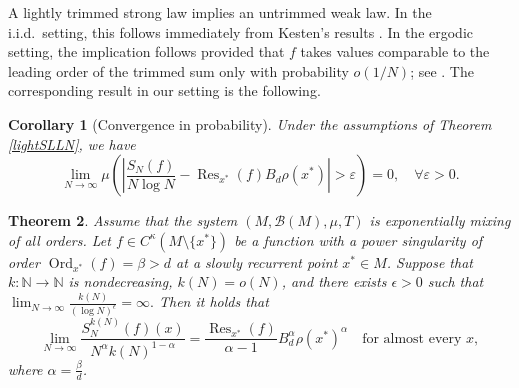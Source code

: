 \documentclass[11pt,twoside,a4paper,reqno]{amsart}
\newtheorem{theorem}{Theorem}
\newtheorem{corollary}[theorem]{Corollary}
\begin{document}
A lightly trimmed strong law implies an untrimmed weak law. In the i.i.d.\ setting, this follows immediately from Kesten's results \cite{kestenweak}. In the ergodic setting, the implication follows provided that $f$ takes values comparable to the leading order of the trimmed sum only with probability $o(1/N)$; see \cite[Remark 7]{AS25}. The corresponding result in our setting is the following.



\begin{corollary}[Convergence in probability]\label{SNCP}
Under the assumptions of Theorem \ref{lightSLLN}, we have
$$
\lim_{N \to \infty} \mu\left( \left| \frac{S_N(f)}{N \log N} - \operatorname{Res}_{x^*}(f)B_d \rho(x^*)\right| > \varepsilon \right) = 0, \quad \forall \varepsilon > 0.
$$
\end{corollary}

\begin{theorem}\label{interSLLN}
Assume that the system $(M, \mathcal{B}(M), \mu, T)$ is exponentially mixing of all orders. Let $f \in C^{\kappa}(M \setminus \{x^*\})$ be a function with a power singularity of order $\operatorname{Ord}_{x^*}(f)=\beta>d$ at a slowly recurrent point $x^*\in M$. Suppose that $k:\mathbb{N}\to\mathbb{N}$ is nondecreasing, $k(N)=o(N)$, and there exists $\epsilon>0$ such that $\lim_{N\rightarrow \infty} \frac{k(N)}{(\log N)^{\epsilon}} = \infty.$ Then it holds that
\begin{equation*}
\lim_{N\rightarrow \infty} \frac{S_N^{k(N)}(f)(x)}{N^{\alpha} k(N)^{1-\alpha}} = \frac{\operatorname{Res}_{x^*}(f)}{\alpha-1} B_d^{\alpha} \rho(x^*)^{\alpha}\quad \text{for almost every } x,
\end{equation*}
where $\alpha=\frac{\beta}{d}$.
\end{theorem}
\end{document}
